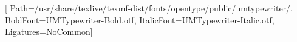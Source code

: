 \usepackage[paperwidth=\LargPage,paperheight=\HautPage,
            left=\OrigX,top=\OrigY,right=0mm,bottom=-80mm,
            noheadfoot,nomarginpar]{geometry}
\pagestyle{empty}
\setlength\parindent{0pt}\setlength\parskip{0pt}
\setlength\topskip{0pt}\setlength\lineskiplimit{-\maxdimen}
\setlength\baselineskip{\PasV}
\raggedbottom \raggedright {} \hfuzz=200pt
\frenchspacing
\AtBeginDocument{\spaceskip=\PasH \xspaceskip=\PasH}

\usepackage{fontspec}
\newcommand\CorpsTapuscrit{0.190476in}
\newfontfamily{}[
  Path=/usr/share/texlive/texmf-dist/fonts/opentype/public/umtypewriter/,
  BoldFont=UMTypewriter-Bold.otf, ItalicFont=UMTypewriter-Italic.otf,
  Ligatures=NoCommon]

\newcommand\lig[1]{\hbox to 0pt{\vrule height 8.8pt depth 3.4pt width 0pt #1\hss}}
\let\l\lig

\newcommand\cel[1]{\hskip #1\PasH\relax}

\newsavebox\bxsou
\newcommand\sou[1]{%
  \sbox\bxsou{#1}%
  \hbox{\rlap{\usebox\bxsou}%
        \raisebox{-\SouProf}{\rule{\wd\bxsou}{\SouEpais}}}}

\newcommand\sur[2]{\makebox[0pt][l]{#1}#2}

\newsavebox\bxbar
\newcommand\barre[1]{%
  \sbox\bxbar{#1}%
  \hbox{\rlap{\usebox\bxbar}\raisebox{2.8pt}{\rule{\wd\bxbar}{0.7pt}}}}

\newcommand\marge[3][0pt]{%
  \begingroup\setbox0\hbox{#3}%
  \hbox to 0pt{\kern#1\raisebox{-#2}{\box0}\hss}\endgroup}

